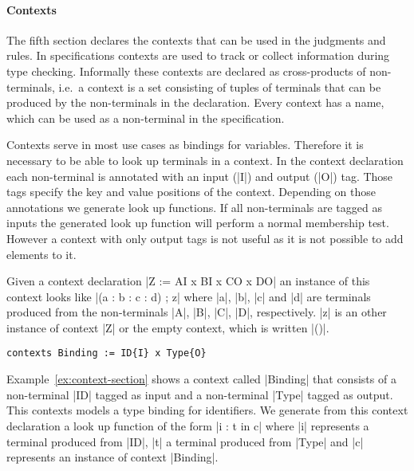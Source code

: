 \paragraph{Contexts} The fifth section declares the contexts that can
be used in the judgments and rules. In specifications contexts are
used to track or collect information during type checking. Informally
these contexts are declared as cross-products of non-terminals, i.e.\
a context is a set consisting of tuples of terminals that can be
produced by the non-terminals in the declaration. Every context has a
name, which can be used as a non-terminal in the specification.

Contexts serve in most use cases as bindings for variables. Therefore
it is necessary to be able to look up terminals in a context. In the
context declaration each non-terminal is annotated with an input
(\code|{I}|) and output (\code|{O}|) tag. Those tags specify the key and
value positions of the context. Depending on those annotations we
generate look up functions. If all non-terminals are tagged as inputs
the generated look up function will perform a normal membership
test. However a context with only output tags is not useful as it is
not possible to add elements to it.

Given a context declaration \code|Z := A{I} x B{I} x C{O} x D{O}| an
instance of this context looks like \code|(a : b : c : d) ; z| where
\code|a|, \code|b|, \code|c| and \code|d| are terminals produced from
the non-terminals \code|A|, \code|B|, \code|C|, \code|D|,
respectively. \code|z| is an other instance of context \code|Z| or the
empty context, which is written \code|()|.

\begin{example}
\begin{lstlisting}[language=sltc]
contexts Binding := ID{I} x Type{O}
\end{lstlisting}
\label{ex:context-section}
\end{example}

Example~\ref{ex:context-section} shows a context called \code|Binding|
that consists of a non-terminal \code|ID| tagged as input and a
non-terminal \code|Type| tagged as output. This contexts models a type
binding for identifiers. We generate from this context declaration a
look up function of the form \code|i : t in c| where \code|i|
represents a terminal produced from \code|ID|, \code|t| a terminal
produced from \code|Type| and \code|c| represents an instance of
context \code|Binding|. 

